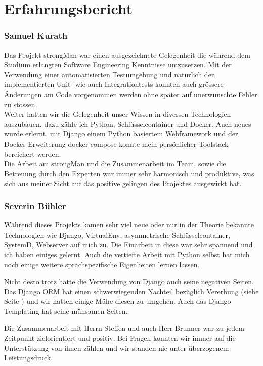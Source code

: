 \section{Erfahrungsbericht}
\subsubsection{Samuel Kurath}
Das Projekt strongMan war einen ausgezeichnete Gelegenheit die während dem Studium erlangten Software Engineering Kenntnisse umzusetzen. Mit der Verwendung einer automatisierten Testumgebung und natürlich den implementierten Unit- wie auch Integrationtests konnten auch grössere Änderungen am Code vorgenommen werden ohne später auf unerwünschte Fehler zu stossen.\\
Weiter hatten wir die Gelegenheit unser Wissen in diversen Technologien auszubauen, dazu zähle ich Python, Schlüsselcontainer und Docker. Auch neues wurde erlernt, mit Django einem Python basiertem Webframework und der Docker Erweiterung docker-compose konnte mein persönlicher Toolstack bereichert werden.\\
Die Arbeit am strongMan und die Zusammenarbeit im Team, sowie die Betreuung durch den Experten war immer sehr harmonisch und produktive, was sich aus meiner Sicht auf das positive gelingen des Projektes ausgewirkt hat.


\subsubsection{Severin Bühler}
Während dieses Projekts kamen sehr viel neue oder nur in der Theorie bekannte Technologien wie Django, VirtualEnv, asymmetrische Schlüsselcontainer, SystemD, Webserver auf mich zu. Die Einarbeit in diese war sehr spannend und ich haben einiges gelernt. Auch die vertiefte Arbeit mit Python selbst hat mich noch einige weitere sprachspezifische Eigenheiten lernen lassen.

Nicht desto trotz hatte die Verwendung von Django auch seine negativen Seiten. Das Django ORM hat einen schwerwiegenden Nachteil bezüglich Vererbung (siehe Seite \pageref{subklassen}) und wir hatten einige Mühe diesen zu umgehen. Auch das Django Templating hat seine mühsamen Seiten.

Die Zusammenarbeit mit Herrn Steffen und auch Herr Brunner war zu jedem Zeitpunkt zielorientiert und positiv. Bei Fragen konnten wir immer auf die Unterstützung von ihnen zählen und wir standen nie unter überzogenem Leistungsdruck. 